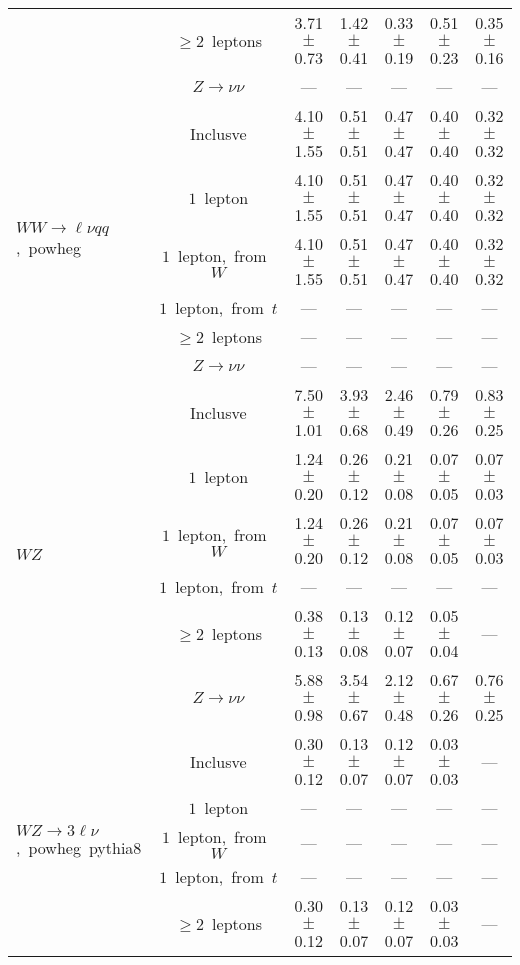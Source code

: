 \documentclass{article}
\begin{document}
\begin{longtable}{|l|c|c|c|c|c|c|}
 & $\ge2$~leptons  & 3.71 $\pm$ 0.73  & 1.42 $\pm$ 0.41  & 0.33 $\pm$ 0.19  & 0.51 $\pm$ 0.23  & 0.35 $\pm$ 0.16 \\* 
 & $Z\rightarrow\nu\nu$  & ---  & ---  & ---  & ---  & --- \\* 
\hline 
\multirow{6}{*}{$WW{\rightarrow}{\ell}{\nu}qq$,~powheg} & Inclusve  & 4.10 $\pm$ 1.55  & 0.51 $\pm$ 0.51  & 0.47 $\pm$ 0.47  & 0.40 $\pm$ 0.40  & 0.32 $\pm$ 0.32 \\* 
 & $1$~lepton  & 4.10 $\pm$ 1.55  & 0.51 $\pm$ 0.51  & 0.47 $\pm$ 0.47  & 0.40 $\pm$ 0.40  & 0.32 $\pm$ 0.32 \\* 
 & $1$~lepton,~from~$W$  & 4.10 $\pm$ 1.55  & 0.51 $\pm$ 0.51  & 0.47 $\pm$ 0.47  & 0.40 $\pm$ 0.40  & 0.32 $\pm$ 0.32 \\* 
 & $1$~lepton,~from~$t$  & ---  & ---  & ---  & ---  & --- \\* 
 & $\ge2$~leptons  & ---  & ---  & ---  & ---  & --- \\* 
 & $Z\rightarrow\nu\nu$  & ---  & ---  & ---  & ---  & --- \\* 
\hline 
\multirow{6}{*}{$WZ$} & Inclusve  & 7.50 $\pm$ 1.01  & 3.93 $\pm$ 0.68  & 2.46 $\pm$ 0.49  & 0.79 $\pm$ 0.26  & 0.83 $\pm$ 0.25 \\* 
 & $1$~lepton  & 1.24 $\pm$ 0.20  & 0.26 $\pm$ 0.12  & 0.21 $\pm$ 0.08  & 0.07 $\pm$ 0.05  & 0.07 $\pm$ 0.03 \\* 
 & $1$~lepton,~from~$W$  & 1.24 $\pm$ 0.20  & 0.26 $\pm$ 0.12  & 0.21 $\pm$ 0.08  & 0.07 $\pm$ 0.05  & 0.07 $\pm$ 0.03 \\* 
 & $1$~lepton,~from~$t$  & ---  & ---  & ---  & ---  & --- \\* 
 & $\ge2$~leptons  & 0.38 $\pm$ 0.13  & 0.13 $\pm$ 0.08  & 0.12 $\pm$ 0.07  & 0.05 $\pm$ 0.04  & --- \\* 
 & $Z\rightarrow\nu\nu$  & 5.88 $\pm$ 0.98  & 3.54 $\pm$ 0.67  & 2.12 $\pm$ 0.48  & 0.67 $\pm$ 0.26  & 0.76 $\pm$ 0.25 \\* 
\hline 
\multirow{6}{*}{$WZ{\rightarrow}3\ell\nu$,~powheg~pythia8} & Inclusve  & 0.30 $\pm$ 0.12  & 0.13 $\pm$ 0.07  & 0.12 $\pm$ 0.07  & 0.03 $\pm$ 0.03  & --- \\* 
 & $1$~lepton  & ---  & ---  & ---  & ---  & --- \\* 
 & $1$~lepton,~from~$W$  & ---  & ---  & ---  & ---  & --- \\* 
 & $1$~lepton,~from~$t$  & ---  & ---  & ---  & ---  & --- \\* 
 & $\ge2$~leptons  & 0.30 $\pm$ 0.12  & 0.13 $\pm$ 0.07  & 0.12 $\pm$ 0.07  & 0.03 $\pm$ 0.03  & --- \\* 

\end{longtable}
\end{document}

